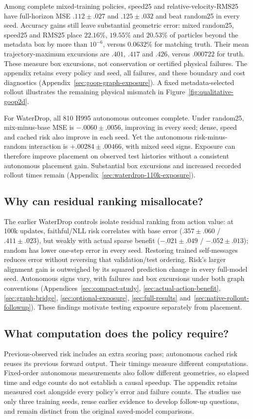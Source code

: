 Among complete mixed-training policies, speed25 and relative-velocity-RMS25 have full-horizon MSE $.112\pm.027$ and $.125\pm.032$ and beat random25 in every seed. Accuracy gains still leave substantial geometric error: mixed random25, speed25 and RMS25 place $22.16\%$, $19.55\%$ and $20.53\%$ of particles beyond the metadata box by more than $10^{-6}$, versus $0.0632\%$ for matching truth. Their mean trajectory-maximum excursions are $.401$, $.417$ and $.426$, versus $.000722$ for truth. These measure box excursions, not conservation or certified physical failures. The appendix retains every policy and seed, all failures, and these boundary and cost diagnostics (Appendix~\ref{sec:goop-graph-exposure}). A fixed metadata-selected rollout illustrates the remaining physical mismatch in Figure~\ref{fig:qualitative-goop2d}.

For WaterDrop, all 810 H995 autonomous outcomes complete. Under random25, mix-minus-base MSE is $-.0060\pm.0056$, improving in every seed; dense, speed and cached risk also improve in each seed. Yet the autonomous risk-minus-random interaction is $+.00284\pm.00466$, with mixed seed signs. Exposure can therefore improve placement on observed test histories without a consistent autonomous placement gain. Substantial box excursions and increased recorded rollout times remain (Appendix~\ref{sec:waterdrop-110k-exposure}).

\subsection{Why can residual ranking misallocate?}
The earlier WaterDrop controls isolate residual ranking from action value: at 100k updates, faithful/NLL risk correlates with base error ($.357\pm.060$ / $.411\pm.023$), but weakly with actual sparse benefit ($-.021\pm.049$ / $-.052\pm.013$); random has lower one-step error in every seed. Restoring trained self-messages reduces error without reversing that validation/test ordering. Risk's larger alignment gain is outweighed by its squared prediction change in every full-model seed. Autonomous signs vary, with failures and box excursions under both graph conventions (Appendices~\ref{sec:compact-study}, \ref{sec:actual-action-benefit}, \ref{sec:graph-bridge}, \ref{sec:optional-exposure}, \ref{sec:full-results} and~\ref{sec:native-rollout-followup}). These findings motivate testing exposure separately from placement.

\subsection{What computation does the policy require?}
Previous-observed risk includes an extra scoring pass; autonomous cached risk reuses its previous forward output. Their timings measure different computations. Fixed-order autonomous measurements also follow different geometries, so elapsed time and edge counts do not establish a causal speedup. The appendix retains measured cost alongside every policy's error and failure counts. The studies use only three training seeds, reuse earlier evidence to develop follow-up questions, and remain distinct from the original saved-model comparisons.
